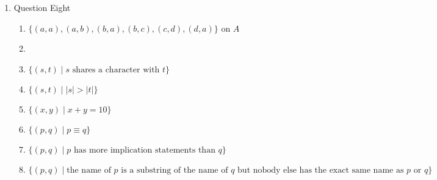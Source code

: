 \documentclass{article}
\begin{document}
\begin{enumerate}
\begin{enumerate}
        \item $L$ has property $F$, because a string $s$ will always have the same length.
        \item
        Claim: $I$ has property $F$
        \begin{proof}
            \begin{align}
                &\text{Choose } x,y,z \in \mathbb{R} \text{ and Assume } I(x,y) \text{ and } I(x,z) \\
                &\text{Since } I(x,y) \text{ and } I(x,z) \text{, we know } x \cdot y=x \cdot z \\
                &\text{Since } x \cdot y=x \cdot z \text{, we know } y=z \text{, therefore } I \text{ has property } F
            \end{align}
        \end{proof}
    \end{enumerate}
    \item Question Eight
    \begin{enumerate}
        \item $\{(a, a), (a, b), (b, a), (b, c), (c,d), (d,a)\}$ on $A$
        \item
        \item $\{(s,t) \mid s \text{ shares a character with } t\}$
        \item $\{(s,t) \mid |s| > |t|\}$
        \item $\{(x,y) \mid x+y=10\}$
        \item $\{(p,q) \mid p \equiv q\}$
        \item $\{(p,q) \mid p \text{ has more implication statements than } q\}$
        \item $\{(p,q) \mid \text{the name of } p \text{ is a substring of the name of } q \text{ but nobody else has the exact same name as } p \text{ or } q\}$
    \end{enumerate}
\end{enumerate}
\end{document}
